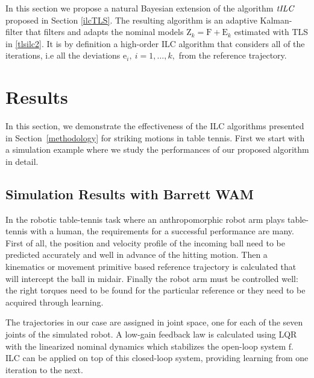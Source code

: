 \documentclass[10pt,a4paper]{article}
\theoremstyle{plain}
\theoremstyle{definition}
\newcommand{\boldvec}[1]{\boldsymbol{\mathrm{#1}}}
\let\vec\boldvec
\newcommand{\error}{\vec{e}} %
\newcommand{\latentMat}{\vec{Z}} %
\newcommand{\errorMat}{\vec{E}} %
\newcommand{\systemMat}{\vec{F}} %
\newcommand{\dynamics}{\vec{f}}
\newcommand{\alg}{\emph{tILC}}
\begin{document}
In this section we propose a natural Bayesian extension of the algorithm $\alg$ proposed in Section \ref{ilcTLS}. The resulting algorithm is an adaptive Kalman-filter that filters and adapts the nominal models $\latentMat_k = \systemMat + \errorMat_k$ estimated with TLS in \eqref{tlsilc2}. It is by definition a high-order ILC algorithm that considers all of the iterations, i.e all the deviations $\error_i, \ i = 1, \ldots, k,$ from the reference trajectory. 



\section{Results}\label{results}

In this section, we demonstrate the effectiveness of the ILC algorithms presented in Section~\ref{methodology} for striking motions in table tennis. First we start with a simulation example where we study the performances of our proposed algorithm in detail.
%
\subsection{Simulation Results with Barrett WAM}

In the robotic table-tennis task where an anthropomorphic robot arm plays table-tennis with a human, the requirements for a successful performance are many. First of all, the position and velocity profile of the incoming ball need to be predicted accurately and well in advance of the hitting motion. Then a kinematics or movement primitive based reference trajectory is calculated that will intercept the ball in midair. Finally the robot arm must be controlled well: the right torques need to be found for the particular reference or they need to be acquired through learning.

The trajectories in our case are assigned in joint space, one for each of the seven joints of the simulated robot. A low-gain feedback law is calculated using LQR with the linearized nominal dynamics which stabilizes the open-loop system $\dynamics$. ILC can be applied on top of this closed-loop system, providing learning from one iteration to the next. 
\end{document}
